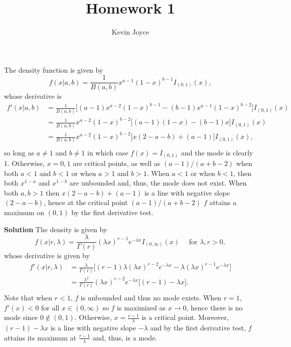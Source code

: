 \documentclass{stat_homework}
\title{Homework 1}
\author{Kevin Joyce}
\begin{document}

  \begin{solution}
  The density function is given by 
  $$
    f(x|a,b) = \frac{1}{B(a,b)} x^{a-1}(1-x)^{b-1}I_{(0,1)}(x),
  $$
  whose derivative is 
  \begin{align*}
    f'(x|a,b) &= \frac{1}{B(a,b)} \Big[ (a-1)x^{a-2}(1-x)^{b-1} - (b-1)x^{a-1}(1-x)^{b-2}\Big]I_{(0,1)}(x) \\
	      &= \frac{1}{B(a,b)} x^{a-2}(1-x)^{b-2} \big[ (a-1)(1-x) - (b-1)x \big]I_{(0,1)}(x) \\
	      &= \frac{1}{B(a,b)} x^{a-2}(1-x)^{b-2} \big[ x(2-a-b) + (a-1)  \big]I_{(0,1)}(x), \\
  \end{align*}
  so long as $a\not=1$ and $b\not=1$ in which case $f(x) = I_{(0,1)}$ and the mode is clearly 1.  Otherwise, $x=0, 1$ are critical points, as well as $(a-1)/(a+b-2)$ when both $a<1$ and $b<1$ or when $a>1$ and $b>1$.  When $a<1$ or when $b<1$, then both $x^{1-a}$ and $x^{1-b}$ are unbounded and, thus, the mode does not exist.  When both $a,b>1$ then $x(2-a-b) + (a-1)$ is a line with negative slope $(2-a-b)$, hence at the critical point $(a-1)/(a+b-2)$ $f$ attains a maximum on $(0,1)$ by the first derivative test.
  \end{solution}

  \textbf{Solution}
  The density is given by
  $$
    f(x|r,\lambda) = \frac{\lambda}{\Gamma(r)} (\lambda x)^{r-1}e^{-\lambda x}I_{(0,\infty)}(x) \quad \text{ for } \lambda,r>0,
  $$
  whose derivative is given by
  \begin{align*}
    f'(x|r,\lambda) &= \frac{\lambda}{\Gamma(r)}\Big[ (r-1)\lambda(\lambda x)^{r-2}e^{-\lambda x} - \lambda (\lambda x)^{r-1}e^{-\lambda x} \Big] \\
      &= \frac{\lambda^2}{\Gamma(r)} (\lambda x)^{r-2} e^{-\lambda x}\Big[ (r-1) - \lambda x\Big]. \\
\end{align*}
  Note that when $r < 1$, $f$ is unbounded and thus no mode exists. When $ r = 1 $, $f'(x) < 0$ for all $x \in (0,\infty)$ so $f$ is maximized as $x\to0$, hence there is no mode since $0\notin(0,1)$.  Otherwise, $x = \frac{r-1}{\lambda}$ is a critical point. Moreover, $(r-1) - \lambda x$ is a line with negative slope $-\lambda$ and by the first derivative test, $f$ attains its maximum at $\frac{r-1}{\lambda}$ and, thus, is a mode.  
  
\end{document}
